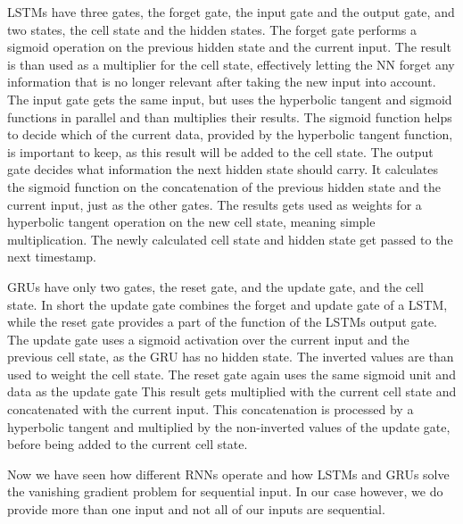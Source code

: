 \documentclass[
	ngerman,
	ruledheaders=section,%
	class=report,%
	thesis={type=bachelor},%
	accentcolor=9c,%
	custommargins=true,%
	marginpar=false,%
	parskip=half-,%
	fontsize=11pt,%
]{tudapub}
\begin{document}
LSTMs have three gates, the forget gate, the input gate and the output gate, and two states, the cell state and the hidden states. \cite{phiIllustratedGuideLSTM2020}
The forget gate performs a sigmoid operation on the previous hidden state and the current input.
The result is than used as a multiplier for the cell state, effectively letting the NN forget any information that is no longer relevant after taking the new input into account.
The input gate gets the same input, but uses the hyperbolic tangent and sigmoid functions in parallel and than multiplies their results.
The sigmoid function helps to decide which of the current data, provided by the hyperbolic tangent function, is important to keep, as this result will be added to the cell state.
The output gate decides what information the next hidden state should carry.
It calculates the sigmoid function on the concatenation of the previous hidden state and the current input, just as the other gates.
The results gets used as weights for a hyperbolic tangent operation on the new cell state, meaning simple multiplication.
The newly calculated cell state and hidden state get passed to the next timestamp.

GRUs have only two gates, the reset gate, and the update gate, and the cell state. \cite{phiIllustratedGuideLSTM2020}
In short the update gate combines the forget and update gate of a LSTM, while the reset gate provides a part of the function of the LSTMs output gate.
The update gate uses a sigmoid activation over the current input and the previous cell state, as the GRU has no hidden state.
The inverted values are than used to weight the cell state.
The reset gate again uses the same sigmoid unit and data as the update gate
This result gets multiplied with the current cell state and concatenated with the current input.
This concatenation is processed by a hyperbolic tangent and multiplied by the non-inverted values of the update gate, before being added to the current cell state.

Now we have seen how different RNNs operate and how LSTMs and GRUs solve the vanishing gradient problem for sequential input.
In our case however, we do provide more than one input and not all of our inputs are sequential.


\end{document}
